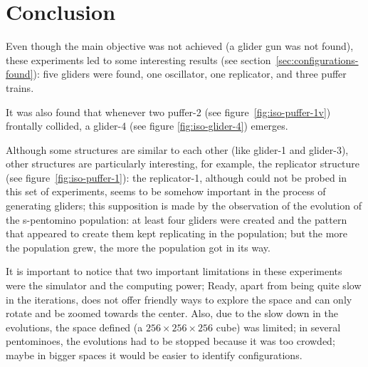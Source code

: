 
\newpage
\section{Conclusion}
Even though the main objective was not achieved (a glider gun was
not found), these experiments led to some interesting results
(see section~\ref{sec:configurations-found}): five gliders were found, one
oscillator, one replicator, and three puffer trains.

It was also found that whenever two puffer-2 (see figure~\ref{fig:iso-puffer-1v})
frontally collided, a glider-4 (see figure \ref{fig:iso-glider-4}) emerges.

Although some structures are similar to each other (like glider-1 and glider-3),
other structures are particularly interesting, for example, the
replicator structure (see figure~\ref{fig:iso-puffer-1}):  the replicator-1,
although could not be probed in this set of experiments, seems to be somehow
important in the process of generating gliders; this supposition is made by the
observation of the evolution of the s-pentomino population: at least four
gliders were created and the pattern that appeared to create them kept
replicating in the population; but the more the population grew, the more the
population got in its way.

It is important to notice that two important limitations in these experiments were
the simulator and the computing power; Ready, apart from being quite slow in the
iterations, does not offer friendly ways to explore the space and can only rotate
and be zoomed towards the center. Also, due to the slow down in the evolutions,
the space defined (a $256\times256\times256$ cube) was limited; in several
pentominoes, the evolutions had to be stopped because it was too crowded; maybe
in bigger spaces it would be easier to identify configurations.
